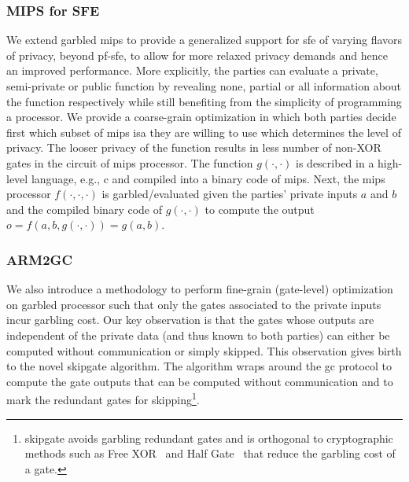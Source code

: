 \subsubsection{MIPS for SFE}
We extend garbled \gls{mips} to provide a generalized support for \acrshort{sfe} of varying flavors of privacy, beyond \acrshort{pf-sfe}, to allow for more relaxed privacy demands and hence an improved performance.
More explicitly, the parties can evaluate a private, semi-private or public function by revealing none, partial or all information about the function respectively while still benefiting from the simplicity of programming a processor.
We provide a coarse-grain optimization in which both parties decide first which subset of \gls{mips} \acrfull{isa} they are willing to use which determines the level of privacy.
The looser privacy of the function results in less number of non-XOR gates in the circuit of \gls{mips} processor.
The function $g(\cdot,\cdot)$ is described in a high-level language, e.g., \gls{c} and compiled into a binary code of \acrshort{mips}.
Next, the \gls{mips} processor $f(\cdot, \cdot, \cdot)$ is garbled/evaluated given the parties' private inputs $a$ and $b$ and the compiled binary code of $g(\cdot,\cdot)$ to compute the output $o = f(a, b, g(\cdot,\cdot)) = g(a,b)$.

\subsubsection{ARM2GC}
We also introduce a methodology to perform fine-grain (gate-level) optimization on garbled processor such that only the gates associated to the private inputs incur garbling cost.
Our key observation is that the gates whose outputs are independent of the private data (and thus known to both parties) can either be computed without communication or simply skipped.
This observation gives birth to the novel \gls{skipgate} algorithm.
The algorithm wraps around the \acrshort{gc} protocol to compute the gate outputs that can be computed without communication and to mark the redundant gates for skipping\footnote{\gls{skipgate} avoids garbling redundant gates and is orthogonal to cryptographic methods such as Free XOR~\cite{kolesnikov2008improved} and Half Gate~\cite{zahur2015two} that reduce the garbling cost of a gate.}.

